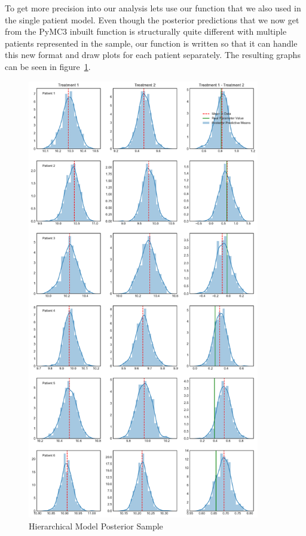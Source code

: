 \documentclass[12pt,a4paper,leqno]{report}
\theoremstyle{plain}
\theoremstyle{definition}
\theoremstyle{remark}
\begin{document}
To get more precision into our analysis lets use our 
function that we also used in the single patient model. Even though the posterior
predictions that we now get from the PyMC3 inbuilt
 function is structurally quite different with
multiple patients represented in the sample, our function is written
so that it can handle this new format and draw plots for each patient separately. The
resulting graphs can be seen in figure\ \ref{hierarchicalmodelposteriorsampling}.

\begin{figure}[H]
    \caption{Hierarchical Model Posterior Sample}\label{hierarchicalmodelposteriorsampling}
    \bigskip
    \centering
    \includegraphics[width=\textwidth,height=7.6in,keepaspectratio]{hierarchical_model_posterior_sampling.pdf}
\end{figure}
\end{document}
